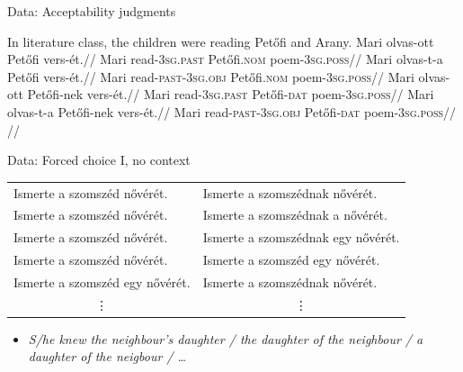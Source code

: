 \documentclass[12pt]{beamer}
\begin{document}
\begin{frame}{Data: Acceptability judgments}

    \pex In literature class, the children were reading Petőfi and Arany.
        \a
            \begingl
                \gla    Mari olvas-ott Petőfi vers-ét.//
                \glb    Mari read-\textsc{3sg.past} Petőfi.\textsc{nom} poem-\textsc{3sg.poss}//
            \endgl
        \a
            \begingl
                \gla    Mari olvas-t-a Petőfi vers-ét.//
                \glb    Mari read-\textsc{past-\alert{3sg.obj}} Petőfi.\textsc{nom} poem-\textsc{3sg.poss}//
            \endgl
        \a
            \begingl
                \gla    Mari olvas-ott Petőfi-nek vers-ét.//
                \glb    Mari read-\textsc{3sg.past} Petőfi-\textsc{\textcolor{red!70!black}{dat}} poem-\textsc{3sg.poss}//
            \endgl
        \a
            \begingl
                \gla    Mari olvas-t-a Petőfi-nek vers-ét.//
                \glb    Mari read-\textsc{past-\alert{3sg.obj}} Petőfi-\textsc{\textcolor{red!70!black}{dat}} poem-\textsc{3sg.poss}//
                \glft   {}//
            \endgl
    \xe

\end{frame}

\begin{frame}{Data: Forced choice I, no context}

\hspace{-.5cm}\begin{tabulary}{1\linewidth}{ll}
Ismerte a szomszéd nővérét.        & Ismerte a szomszéd\textcolor{red!70!black}{nak} nővérét.\\
Ismerte a szomszéd nővérét.        & Ismerte a szomszéd\textcolor{red!70!black}{nak} \textcolor{green!70!black}{a} nővérét.\\
Ismerte a szomszéd nővérét.        & Ismerte a szomszéd\textcolor{red!70!black}{nak} \alert{egy} nővérét.\\
Ismerte a szomszéd nővérét.        & Ismerte a szomszéd \alert{egy} nővérét.\\
Ismerte a szomszéd \alert{egy} nővérét.    & Ismerte a szomszéd\textcolor{red!70!black}{nak} nővérét.\\
 & \\
\end{tabulary}

\begin{itemize}
    \item \emph{S/he knew the neighbour's daughter / \textcolor{green!70!black}{the} daughter \textcolor{red!70!black}{of the} neighbour / \alert{a} daughter \textcolor{red!70!black}{of the} neigbour / \dots}
\end{itemize}

\end{frame}
\end{document}
